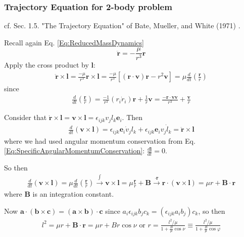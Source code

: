 \documentclass[10pt]{amsart}
\begin{document}
\begin{multicols*}{2}
\subsubsection{Trajectory Equation for 2-body problem}

cf. Sec. 1.5. "The Trajectory Equation" of Bate, Mueller, and White (1971) \cite{BMW1971}.

Recall again Eq. \ref{Eq:ReducedMassDynamics}
\[
\ddot{\mathbf{r}} = - \frac{\mu}{r^3} \mathbf{r}
\]
Apply the cross product by $\mathbf{l}$:
\[
\begin{gathered}
	\ddot{\mathbf{r}} \times \mathbf{l} = \frac{-\mu}{r^3} \mathbf{r} \times \mathbf{l} = \frac{-\mu}{r^3} \left[ (\mathbf{r} \cdot \mathbf{v}) \mathbf{r} - r^2 \mathbf{v} \right] = \mu \frac{d}{dt} \left( \frac{\mathbf{r}}{r} \right)
\end{gathered}
\]
since
\[
\begin{gathered}
	\frac{d}{dt} \left(\frac{\mathbf{r}}{r} \right) = \frac{-1}{r^3} (r_i \dot{r}_i ) \mathbf{r} + \frac{1}{r} \mathbf{v} = \frac{-\mathbf{r}\cdot \mathbf{v} \mathbf{v}}{r^3} + \frac{\mathbf{v}}{r}
\end{gathered}
\]

Consider that $\dot{\mathbf{r}} \times \mathbf{l} = \mathbf{v} \times \mathbf{l} = \epsilon_{ijk} v_j l_k \mathbf{e}_i$. Then
\[
\begin{gathered}
	\frac{d}{dt} (\mathbf{v} \times \mathbf{l}) = \epsilon_{ijk} \mathbf{e}_i \dot{v}_j l_k + \epsilon_{ijk} \mathbf{e}_i v_j \dot{l}_k = \ddot{\mathbf{r}} \times \mathbf{l}
\end{gathered}
\]
where we had used angular momentum conservation from Eq. \ref{Eq:SpecificAngularMomentumConservation}: $\frac{d\mathbf{l}}{dt} = 0$.

So then
\[
\begin{gathered}
	\frac{d}{dt} ( \mathbf{v} \times \mathbf{l}) = \mu \frac{d}{dt} \left( \frac{\mathbf{r}}{r} \right) \xrightarrow{ \int } \mathbf{v} \times \mathbf{l} = \mu \frac{\mathbf{r}}{r} + \mathbf{B} \xrightarrow{ \cdot \mathbf{r} } \mathbf{r} \cdot (\mathbf{v} \times \mathbf{l} ) = \mu r + \mathbf{B} \cdot \mathbf{r}
\end{gathered}
\]
where $\mathbf{B}$ is an integration constant.

Now $\mathbf{a} \cdot (\mathbf{b} \times \mathbf{c}) = (\mathbf{a} \times \mathbf{b}) \cdot \mathbf{c}$ since $a_i \epsilon_{ijk} b_j c_k = (\epsilon_{ijk} a_i b_j) c_k$, so then
\begin{equation}
	\begin{gathered}
		l^2 = \mu r + \mathbf{B}\cdot \mathbf{r} = \mu r + Br \cos{\nu} \text{ or } r = \frac{l^2 / \mu}{ 1 + \frac{B}{\mu} \cos{\nu} } \equiv \frac{l^2/\mu}{ 1 + \frac{B}{\mu} \cos{\varphi} }
	\end{gathered}
\end{equation}


\end{multicols*}
\end{document}
